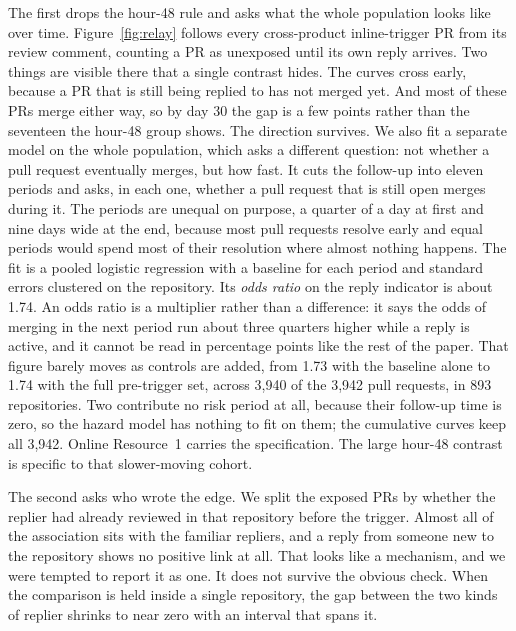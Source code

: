 \documentclass[lineno,pdflatex,sn-basic]{sn-jnl}
\begin{document}
The first drops the hour-48 rule and asks what the whole population looks like
over time. Figure~\ref{fig:relay} follows every cross-product inline-trigger PR
from its review comment, counting a PR as unexposed until its own reply arrives.
Two things are visible there that a single contrast hides. The curves cross
early, because a PR that is still being replied to has not merged yet. And most
of these PRs merge either way, so by day 30 the gap is a few points rather than
the seventeen the hour-48 group shows. The direction survives. We also fit a separate model on the whole population, which asks a different
question: not whether a pull request eventually merges, but how fast. It cuts the
follow-up into eleven periods and asks, in each one, whether a pull request that
is still open merges during it. The periods are unequal on purpose, a quarter of
a day at first and nine days wide at the end, because most pull requests resolve
early and equal periods would spend most of their resolution where almost nothing
happens. The fit is a pooled logistic regression with a baseline for each period
and standard errors clustered on the repository. Its \emph{odds ratio} on the
reply indicator is
about 1.74. An odds ratio is a multiplier rather than a difference: it says the
odds of merging in the next period run about three quarters higher while a reply
is active, and it cannot be read in percentage points like the rest of the
paper. That figure barely moves as controls are added, from 1.73 with the
baseline alone to 1.74 with the full pre-trigger set, across 3,940 of the 3,942 pull requests, in 893 repositories. Two contribute no
risk period at all, because their follow-up time is zero, so the hazard model
has nothing to fit on them; the cumulative curves keep all 3,942. Online Resource~1 carries the specification. The large
hour-48 contrast is specific to that slower-moving cohort.

The second asks who wrote the edge. We split the exposed PRs by whether the
replier had already reviewed in that repository before the trigger. Almost all of
the association sits with the familiar repliers, and a reply from someone new to
the repository shows no positive link at all. That looks like a mechanism, and we were tempted to report it as one. It does not
survive the obvious check. When the comparison is held inside a single
repository, the gap between the two kinds of replier shrinks to near zero with an
interval that spans it.
\end{document}
